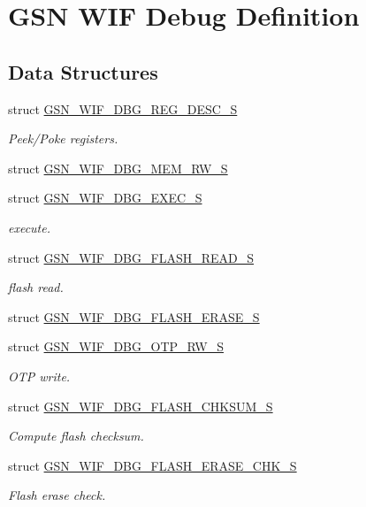 \hypertarget{a00637}{
\section{GSN WIF Debug Definition}
\label{a00637}
}
\subsection*{Data Structures}
\begin{DoxyCompactItemize}
\item 
struct \hyperlink{a00333}{GSN\_\-WIF\_\-DBG\_\-REG\_\-DESC\_\-S}
\begin{DoxyCompactList}\small\item\em Peek/Poke registers. \end{DoxyCompactList}\item 
struct \hyperlink{a00331}{GSN\_\-WIF\_\-DBG\_\-MEM\_\-RW\_\-S}
\item 
struct \hyperlink{a00326}{GSN\_\-WIF\_\-DBG\_\-EXEC\_\-S}
\begin{DoxyCompactList}\small\item\em execute. \end{DoxyCompactList}\item 
struct \hyperlink{a00330}{GSN\_\-WIF\_\-DBG\_\-FLASH\_\-READ\_\-S}
\begin{DoxyCompactList}\small\item\em flash read. \end{DoxyCompactList}\item 
struct \hyperlink{a00329}{GSN\_\-WIF\_\-DBG\_\-FLASH\_\-ERASE\_\-S}
\item 
struct \hyperlink{a00332}{GSN\_\-WIF\_\-DBG\_\-OTP\_\-RW\_\-S}
\begin{DoxyCompactList}\small\item\em OTP write. \end{DoxyCompactList}\item 
struct \hyperlink{a00327}{GSN\_\-WIF\_\-DBG\_\-FLASH\_\-CHKSUM\_\-S}
\begin{DoxyCompactList}\small\item\em Compute flash checksum. \end{DoxyCompactList}\item 
struct \hyperlink{a00328}{GSN\_\-WIF\_\-DBG\_\-FLASH\_\-ERASE\_\-CHK\_\-S}
\begin{DoxyCompactList}\small\item\em Flash erase check. \end{DoxyCompactList}\end{DoxyCompactItemize}
